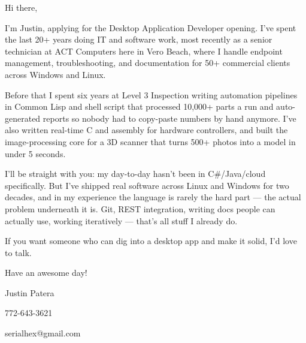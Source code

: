 
Hi there,

\smallskip

I'm Justin, applying for the Desktop Application Developer opening. I've spent the last 20+ years doing IT and software work, most recently as a senior technician at ACT Computers here in Vero Beach, where I handle endpoint management, troubleshooting, and documentation for 50+ commercial clients across Windows and Linux.

\smallskip

Before that I spent six years at Level 3 Inspection writing automation pipelines in Common Lisp and shell script that processed 10,000+ parts a run and auto-generated reports so nobody had to copy-paste numbers by hand anymore. I've also written real-time C and assembly for hardware controllers, and built the image-processing core for a 3D scanner that turns 500+ photos into a model in under 5 seconds.

\smallskip

I'll be straight with you: my day-to-day hasn't been in C\#/Java/cloud specifically. But I've shipped real software across Linux and Windows for two decades, and in my experience the language is rarely the hard part — the actual problem underneath it is. Git, REST integration, writing docs people can actually use, working iteratively — that's all stuff I already do.

\smallskip

If you want someone who can dig into a desktop app and make it solid, I'd love to talk.

\smallskip

Have an awesome day!

Justin Patera

772-643-3621

serialhex@gmail.com
